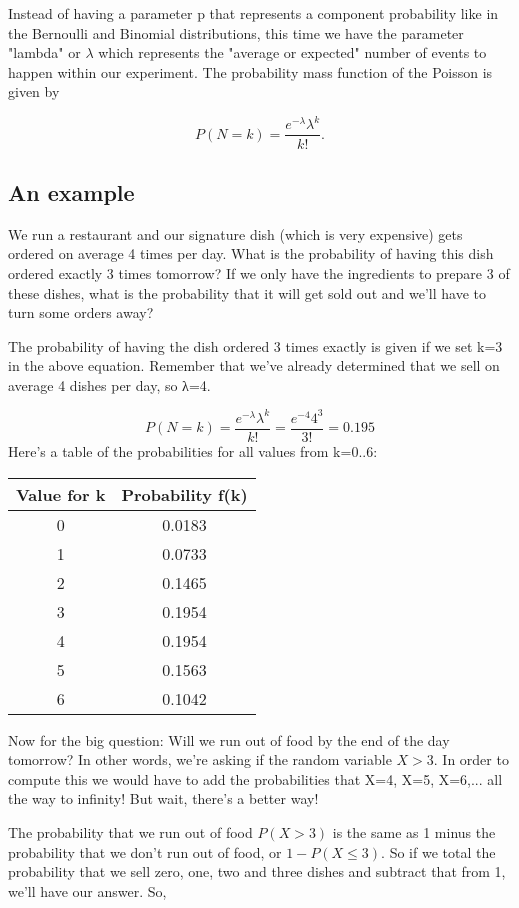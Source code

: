 \documentclass[a4paper,12pt]{article}
\begin{document}
Instead of having a parameter p that represents a component probability like in the Bernoulli and Binomial distributions, this time we have the parameter "lambda" or $\lambda$ which represents the "average or expected" number of events to happen within our experiment. The probability mass function of the Poisson is given by

$$P(N=k)=\frac{e^{-\lambda}\lambda^k}{k!}.$$
\subsection{An example}
We run a restaurant and our signature dish (which is very expensive) gets ordered on average 4 times per day. What is the probability of having this dish ordered exactly 3 times tomorrow? If we only have the ingredients to prepare 3 of these dishes, what is the probability that it will get sold out and we'll have to turn some orders away?

The probability of having the dish ordered 3 times exactly is given if we set k=3 in the above equation. Remember that we've already determined that we sell on average 4 dishes per day, so λ=4.

$$P(N=k)=\frac{e^{-\lambda}\lambda^k}{k!} = \frac{e^{-4} 4^3}{3!} = 0.195$$
Here's a table of the probabilities for all values from k=0..6:

\begin{tabular}{|c|c|}
Value for k& Probability f(k) \\ \hline
0& 0.0183 \\ \hline
1& 0.0733 \\ \hline
2& 0.1465 \\ \hline
3& 0.1954 \\ \hline
4& 0.1954 \\ \hline
5& 0.1563 \\ \hline
6& 0.1042 \\ \hline
\end{tabular}

Now for the big question: Will we run out of food by the end of the day tomorrow? In other words, we're asking if the random variable $X>3$. 
In order to compute this we would have to add the probabilities that X=4, X=5, X=6,... all the way to infinity! But wait, there's a better way!

The probability that we run out of food $P(X>3)$ is the same as 1 minus the probability that we don't run out of food, or $1-P(X \leq 3)$. So if we total the probability that we sell zero, one, two and three dishes and subtract that from 1, we'll have our answer. So,
\end{document}
